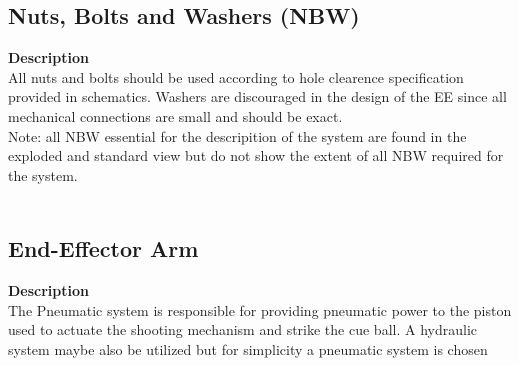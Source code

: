 \documentclass[titlepage]{article}
\begin{document}

\subsection{Nuts, Bolts and Washers (NBW)}
\textbf{Description}\\
All nuts and bolts should be used according to hole clearence specification provided in schematics. Washers are discouraged in the design of the EE since all mechanical connections are small and should be exact. \\Note: all NBW essential for the descripition of the system are found in the exploded and standard view but do not show the extent of all NBW required for the system.\\~\\





\newpage
\subsection{End-Effector Arm}
\textbf{Description}\\
The Pneumatic system is responsible for providing pneumatic power to the piston used to actuate the shooting mechanism and strike the cue ball. A hydraulic system maybe also be utilized but for simplicity a pneumatic system is chosen\\~\\

\newpage
\end{document}
